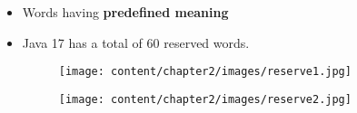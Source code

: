 
\begin{flushleft}
	
	\begin{itemize}
		
		\item Words having \textbf{predefined meaning}
		\item Java 17 has a total of 60 reserved words.
		
		\begin{figure}[h!]
			\centering
			\texttt{[image: content/chapter2/images/reserve1.jpg]}
		\end{figure}		
		
		\begin{figure}[h!]
			\centering
			\texttt{[image: content/chapter2/images/reserve2.jpg]}
		\end{figure}		
	
			
	\end{itemize}	

	
	
		
	
\end{flushleft}
\newpage
